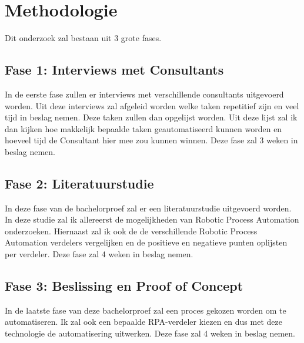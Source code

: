 


\section{Methodologie}%
\label{sec:methodologie}
Dit onderzoek zal bestaan uit 3 grote fases.
\subsection{Fase 1: Interviews met Consultants}
\label{Fase 1: Interviews met Consultants}
In de eerste fase zullen er interviews met verschillende consultants uitgevoerd worden. Uit deze interviews zal afgeleid worden welke taken repetitief zijn en veel tijd in beslag nemen. Deze taken zullen dan opgelijst worden. Uit deze lijst zal ik dan kijken hoe makkelijk bepaalde taken geautomatiseerd kunnen worden en hoeveel tijd de Consultant hier mee zou kunnen winnen.
Deze fase zal 3 weken in beslag nemen.
\subsection{Fase 2: Literatuurstudie}
\label{Fase 2: Literatuurstudie}
In deze fase van de bachelorproef zal er een literatuurstudie uitgevoerd worden. In deze studie zal ik allereerst de mogelijkheden van Robotic Process Automation onderzoeken. Hiernaast zal ik ook de de verschillende Robotic Process Automation verdelers vergelijken en de positieve en negatieve punten oplijsten per verdeler.
Deze fase zal 4 weken in beslag nemen.
\subsection{Fase 3: Beslissing en Proof of Concept}
\label{Fase 3: Beslissing en Proof of Concept}
In de laatste fase van deze bachelorproef zal een proces gekozen worden om te automatiseren. Ik zal ook een bepaalde RPA-verdeler kiezen en dus met deze technologie de automatisering uitwerken.
Deze fase zal 4 weken in beslag nemen.


